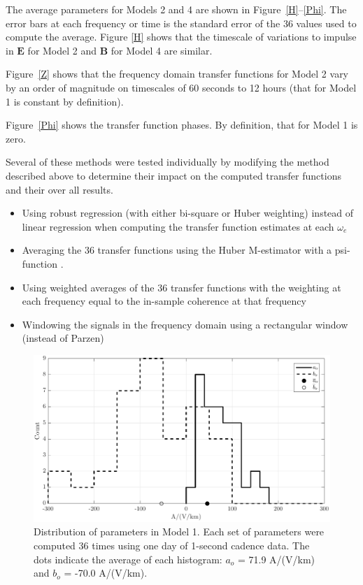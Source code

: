 \documentclass[draft,linenumbers]{agujournal2018}
\begin{document}
The average parameters for Models 2 and 4 are shown in Figure~\ref{H}--\ref{Phi}. The error bars at each frequency or time is the standard error of the 36 values used to compute the average. Figure \ref{H} shows that the timescale of variations to impulse in $\mathbf{E}$ for Model 2 and $\mathbf{B}$ for Model 4 are similar.

Figure~\ref{Z} shows that the frequency domain transfer functions for Model 2 vary by an order of magnitude on timescales of 60 seconds to 12 hours (that for Model 1 is constant by definition).

Figure~\ref{Phi} shows the transfer function phases. By definition, that for Model 1 is zero.

Several of these methods were tested individually by modifying the method described above to determine their impact on the computed transfer functions and their over all results. 

\begin{itemize}
\item Using robust regression (with either bi-square or Huber weighting) instead of linear regression when computing the transfer function estimates at each $\omega_e$

\item Averaging the 36 transfer functions using the Huber M-estimator with a psi-function \citep{Huber2011}. 

\item Using weighted averages of the 36 transfer functions with the weighting at each frequency equal to the in-sample coherence at that frequency

\item Windowing the signals in the frequency domain using a rectangular window (instead of Parzen)
\end{itemize}

\begin{figure}[h]
\centering
\includegraphics[width=\textwidth]{figures/plot_TF_aves_aobo_histograms-options-1.pdf}
\caption{Distribution of parameters in Model 1. Each set of parameters were computed 36 times using one day of 1-second cadence data. The dots indicate the average of each histogram: $a_o$ = 71.9 A/(V/km) and $b_o$ = -70.0 A/(V/km).}
\label{histogram}
\end{figure}
\end{document}
